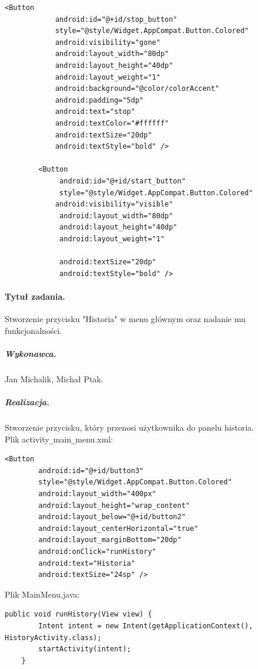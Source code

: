 \documentclass[a4paper]{article}
\begin{document}
\begin{lstlisting}[style=xml]
        <Button
            android:id="@+id/stop_button"
            style="@style/Widget.AppCompat.Button.Colored"
            android:visibility="gone"
            android:layout_width="80dp"
            android:layout_height="40dp"
            android:layout_weight="1"
            android:background="@color/colorAccent"
            android:padding="5dp"
            android:text="stop"
            android:textColor="#ffffff"
            android:textSize="20dp"
            android:textStyle="bold" />

        <Button
             android:id="@+id/start_button"
             style="@style/Widget.AppCompat.Button.Colored"
            android:visibility="visible"
             android:layout_width="80dp"
             android:layout_height="40dp"
             android:layout_weight="1"
             
             android:textSize="20dp"
             android:textStyle="bold" />
\end{lstlisting}
 
\paragraph{Tytuł zadania.} Stworzenie przycisku "Historia" w menu głównym oraz nadanie mu funkcjonalności.
\subparagraph{Wykonawca.} Jan Michalik, Michał Ptak.
\subparagraph{Realizacja.} Stworzenie przycisku, który przenosi użytkownika do panelu historia.\\
Plik activity\verb|_|main\verb|_|menu.xml:
\begin{lstlisting}[style=xml]
<Button
        android:id="@+id/button3"
        style="@style/Widget.AppCompat.Button.Colored"
        android:layout_width="400px"
        android:layout_height="wrap_content"
        android:layout_below="@+id/button2"
        android:layout_centerHorizontal="true"
        android:layout_marginBottom="20dp"
        android:onClick="runHistory"
        android:text="Historia"
        android:textSize="24sp" />
\end{lstlisting}
Plik MainMenu.java:
\begin{lstlisting}[style=java]
 public void runHistory(View view) {
        Intent intent = new Intent(getApplicationContext(), HistoryActivity.class);
        startActivity(intent);
    }

\end{lstlisting}
\end{document}

